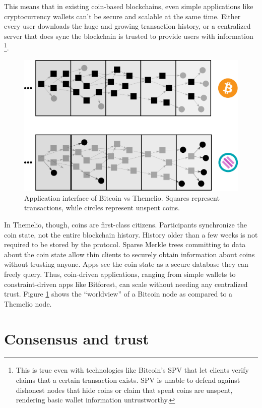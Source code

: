 \documentclass[headinclude]{scrbook}
\begin{document}
This means that in existing coin-based blockchains, even simple applications like cryptocurrency wallets can't be secure and scalable at the same time. Either every user downloads the huge and growing transaction history, or a centralized server that does sync the blockchain is trusted to provide users with information \footnote{This is true even with technologies like Bitcoin's SPV that let clients verify claims that a certain transaction exists. SPV is unable to defend against dishonest nodes that hide coins or claim that spent coins are unspent, rendering basic wallet information untrustworthy.}.

\begin{figure}
    \centering
    \includegraphics[width=\textwidth]{coinint.eps}
    \caption{Application interface of Bitcoin vs Themelio. Squares represent transactions, while circles represent unspent coins.}
    \label{fig:coinint}
\end{figure}

In Themelio, though, coins are first-class citizens. Participants synchronize the coin state, not the entire blockchain history. History older than a few weeks is not required to be stored by the protocol. Sparse Merkle trees committing to data about the coin state allow thin clients to securely obtain information about coins without trusting anyone. Apps see the coin state as a secure database they can freely query. Thus, coin-driven applications, ranging from simple wallets to constraint-driven apps like Bitforest, can scale without needing any centralized trust. Figure \ref{fig:coinint} shows the ``worldview'' of a Bitcoin node as compared to a Themelio node.

\section{Consensus and trust} \label{ss:consensus}
\end{document}
